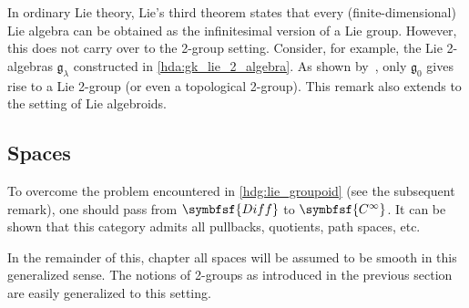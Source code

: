 
    \begin{remark}
        In ordinary Lie theory, Lie's third theorem states that every (finite-dimensional) Lie algebra can be obtained as the infinitesimal version of a Lie group. However, this does not carry over to the 2-group setting. Consider, for example, the Lie 2-algebras $\mathfrak{g}_\lambda$ constructed in \cref{hda:gk_lie_2_algebra}. As shown by~\citet{baez_higher-dimensional_2003-1}, only $\mathfrak{g}_0$ gives rise to a Lie 2-group (or even a topological 2-group). This remark also extends to the setting of Lie algebroids.
    \end{remark}

\subsection{Spaces}

    To overcome the problem encountered in \cref{hdg:lie_groupoid} (see the subsequent remark), one should pass from $\symbfsf{Diff}$ to $\symbfsf{C^\infty}$. It can be shown that this category admits all pullbacks, quotients, path spaces, etc.


    In the remainder of this, chapter all spaces will be assumed to be smooth in this generalized sense. The notions of 2-groups as introduced in the previous section are easily generalized to this setting.


